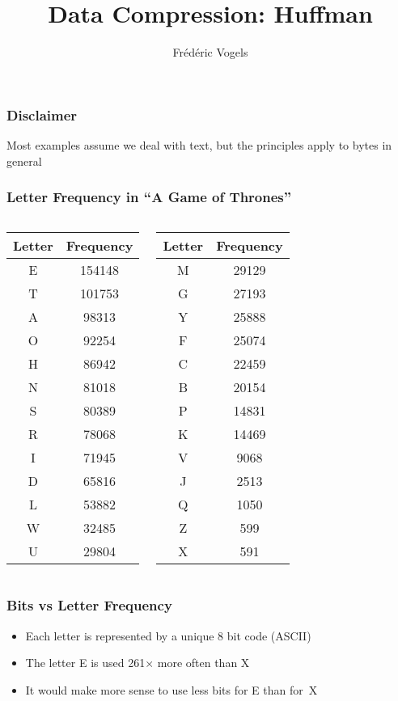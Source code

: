 \documentclass{../ucll-slides}
\title{Data Compression: Huffman}
\author{Fr\'ed\'eric Vogels}
\begin{document}
\begin{frame}
  \titlepage
\end{frame}

\begin{frame}
  \frametitle{Disclaimer}
  \begin{center}
    \Large
    Most examples assume we deal with text,
    but the principles apply to bytes in general
  \end{center}
\end{frame}

{
  \newcommand{\freq}[2]{#1 & \SI{#2}{} \\}
  \begin{frame}
    \frametitle{Letter Frequency in ``A Game of Thrones''}

    \begin{columns}
      \column{4cm}
      \begin{center}
        \begin{tabular}{cc}
          \textbf{Letter} & \textbf{Frequency} \\
          \toprule
          \freq{E}{154148}
          \freq{T}{101753}
          \freq{A}{98313}
          \freq{O}{92254}
          \freq{H}{86942}
          \freq{N}{81018}
          \freq{S}{80389}
          \freq{R}{78068}
          \freq{I}{71945}
          \freq{D}{65816}
          \freq{L}{53882}
          \freq{W}{32485}
          \freq{U}{29804}
        \end{tabular}
      \end{center}

      \column{4cm}
      \begin{center}
        \begin{tabular}{cc}
          \textbf{Letter} & \textbf{Frequency} \\
          \toprule
          \freq{M}{29129}
          \freq{G}{27193}
          \freq{Y}{25888}
          \freq{F}{25074}
          \freq{C}{22459}
          \freq{B}{20154}
          \freq{P}{14831}
          \freq{K}{14469}
          \freq{V}{9068}
          \freq{J}{2513}
          \freq{Q}{1050}
          \freq{Z}{599}
          \freq{X}{591}
        \end{tabular}
      \end{center}
    \end{columns}
  \end{frame}
}

\begin{frame}
  \frametitle{Bits vs Letter Frequency}
  \begin{itemize}
    \item Each letter is represented by a unique 8 bit code (ASCII)
    \item The letter E is used 261$\times$ more often than X
    \item It would make more sense to use less bits for E than for~X
  \end{itemize}
\end{frame}
\end{document}

